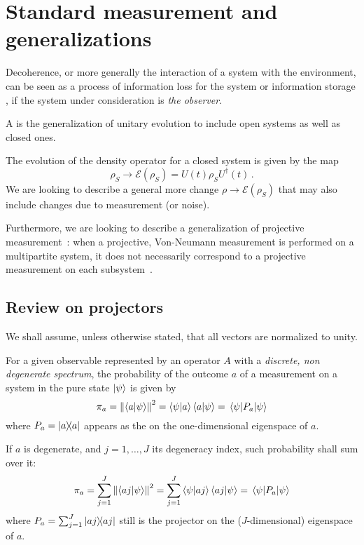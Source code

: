 \section{Standard measurement and generalizations}

Decoherence,
or more generally the interaction of a system with the environment,
can be seen as a process of information loss for the system
\parencite[Ch. 9]{Nakahara} or information storage
\parencite{Zurek_Einselect}, if the system under consideration
is \emph{the observer}.

A  \parencite[Ch. 9]{Nakahara} is the generalization
of unitary evolution to include open systems as well as closed ones.

The evolution of the density operator for a closed system is given by the map
\[
    \rho_{S} \rightarrow \mathcal{E}(\rho_{S}) = U(t)\rho_{S}U^{\dagger}(t) \, \text{.}
\] 
We are looking to describe a general more change
$\rho \rightarrow \mathcal{E}(\rho_{S})$ that may also include
changes due to measurement (or noise).

Furthermore, we are looking to describe a generalization
of projective measurement~\parencite{VonNeumann}:
when a projective, Von-Neumann
measurement is performed on a multipartite system,
it does not necessarily correspond to a projective measurement
on each subsystem~\parencite[Ch. 3]{PreskillNotes}.

\subsection{Review on projectors}

We shall assume, unless otherwise stated, that all vectors are
normalized to unity.

For a given observable represented by an operator $A$ with a
\emph{discrete, non degenerate spectrum}, the probability of the
outcome $a$ of a
measurement on a system in the pure state $\ket{\psi}$ is given by
$$
\pi_{a} = \norm{\braket{a}{\psi}}^2
        = \bra{\psi}\ket{a}\bra{a}\ket{\psi}
        = \mel{\psi}{P_{a}}{\psi}
$$
where $P_{a} = \ketbra{a}$ appears as the  on the
one-dimensional eigenspace of  $a$.

If $a$ is degenerate, and $j = 1, \dots, J$ its degeneracy index,
such probability shall sum over it:
$$
\pi_{a} = \sum_{j=1}^{J}\norm{\braket{aj}{\psi}}^2
        = \sum_{j=1}^{J}\bra{\psi}\ket{aj}\bra{aj}\ket{\psi}
        = \mel{\psi}{P_{a}}{\psi}
$$
where $P_{a} = \sum_{j=1}^{J}\ketbra{aj}$
still is the projector on the
($J$-dimensional) eigenspace of $a$.

